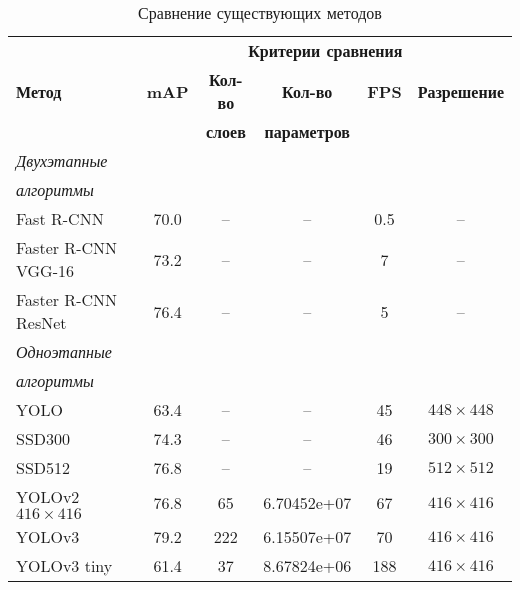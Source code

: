 \begin{table}[!h]
    \small
    \begin{center}
        \caption{Сравнение существующих методов}
        \label{tbl:cmp-by-fps}
        \begin{tabular}{|l|c|c|c|c|c|}
            \hline
            & \multicolumn{5}{c|}{\bfseries Критерии сравнения} \\ \cline{2-6}
            \bfseries Метод & \bfseries mAP & \bfseries Кол-во & \bfseries Кол-во & \bfseries FPS & \bfseries Разрешение \\
            & & \bfseries слоев & \bfseries  параметров & &\\\hline
            \textit{Двухэтапные} & & & & &\\
            \textit{алгоритмы} & & & & &\\
            Fast R-CNN              & 70.0 & --  & --          & 0.5 & -- \\
            Faster R-CNN VGG-16     & 73.2 & --  & --          & 7 & -- \\
            Faster R-CNN ResNet     & 76.4 & --  & --          & 5 & -- \\
            \textit{Одноэтапные} & & & & & \\
            \textit{алгоритмы} & & & & & \\
            YOLO                    & 63.4 & --  & --          & 45 & $448 \times 448$ \\
            SSD300                  & 74.3 & --  & --          & 46 & $300 \times 300$ \\
            SSD512                  & 76.8 & --  & --          & 19 & $512 \times 512$ \\
            YOLOv2 $416 \times 416$ & 76.8 & 65  & 6.70452e+07 & 67 & $416 \times 416$ \\
            YOLOv3                  & 79.2 & 222 & 6.15507e+07 & 70 & $416 \times 416$ \\
            YOLOv3 tiny             & 61.4 & 37  & 8.67824e+06 & 188 & $416 \times 416$ \\\hline
        \end{tabular}
    \end{center}
\end{table}

